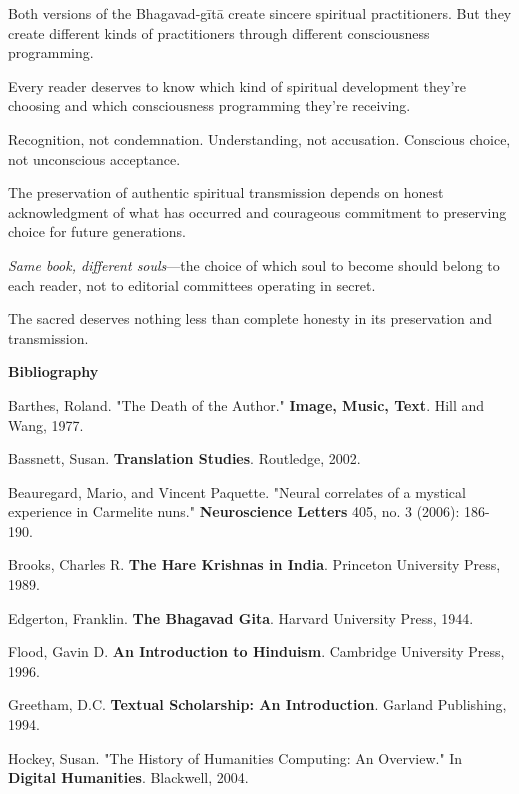 \documentclass[11pt,twoside]{book}
\begin{document}
Both versions of the Bhagavad-gītā create sincere spiritual practitioners. But they create different kinds of practitioners through different consciousness programming.

Every reader deserves to know which kind of spiritual development they're choosing and which consciousness programming they're receiving.

Recognition, not condemnation. Understanding, not accusation. Conscious choice, not unconscious acceptance.

The preservation of authentic spiritual transmission depends on honest acknowledgment of what has occurred and courageous commitment to preserving choice for future generations.

\textit{Same book, different souls}—the choice of which soul to become should belong to each reader, not to editorial committees operating in secret.

The sacred deserves nothing less than complete honesty in its preservation and transmission.

\clearpage
\thispagestyle{empty}
\mbox{}
\newpage
\pagestyle{sectionopening}
\thispagestyle{sectionopening}
\markboth{}{}
\markright{}
\vspace*{0.25\textheight}
\begin{center}
{\Huge\bfseries Bibliography}
\end{center}
\newpage
\pagestyle{sectionopening}
\thispagestyle{sectionopening}

Barthes, Roland. "The Death of the Author." \textbf{Image, Music, Text}. Hill and Wang, 1977.

Bassnett, Susan. \textbf{Translation Studies}. Routledge, 2002.

Beauregard, Mario, and Vincent Paquette. "Neural correlates of a mystical experience in Carmelite nuns." \textbf{Neuroscience Letters} 405, no. 3 (2006): 186-190.

Brooks, Charles R. \textbf{The Hare Krishnas in India}. Princeton University Press, 1989.

Edgerton, Franklin. \textbf{The Bhagavad Gita}. Harvard University Press, 1944.

Flood, Gavin D. \textbf{An Introduction to Hinduism}. Cambridge University Press, 1996.

Greetham, D.C. \textbf{Textual Scholarship: An Introduction}. Garland Publishing, 1994.

Hockey, Susan. "The History of Humanities Computing: An Overview." In \textbf{Digital Humanities}. Blackwell, 2004.
\end{document}

